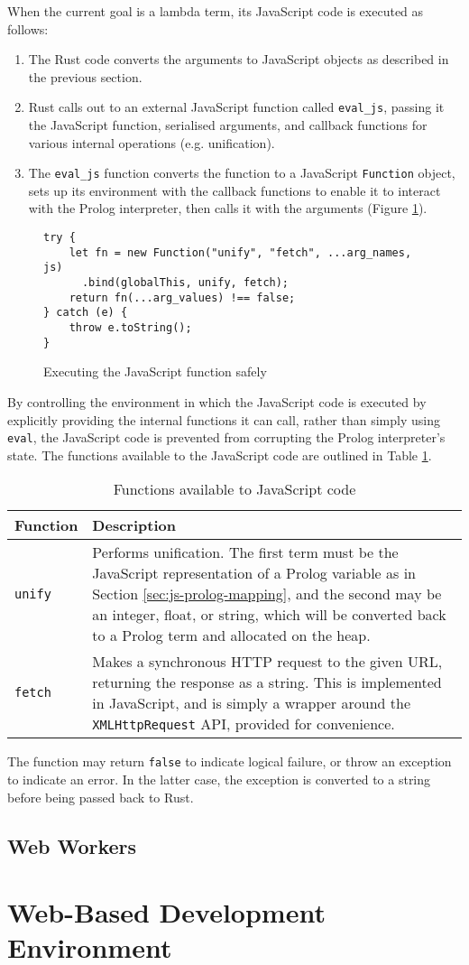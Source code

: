 When the current goal is a lambda term, its JavaScript code is executed as follows:

\begin{enumerate}
\item The Rust code converts the arguments to JavaScript objects as described in the previous section.
\item Rust calls out to an external JavaScript function called \texttt{eval\_js}, passing it the JavaScript function, serialised arguments, and callback functions for various internal operations (e.g. unification).
\item The \texttt{eval\_js} function converts the function to a JavaScript \texttt{Function} object, sets up its environment with the callback functions to enable it to interact with the Prolog interpreter, then calls it with the arguments (Figure \ref{fig:js-execution}).
\end{enumerate}

\begin{figure}[H]
\centering
\begin{verbatim}
try {
    let fn = new Function("unify", "fetch", ...arg_names, js)
      .bind(globalThis, unify, fetch);
    return fn(...arg_values) !== false;
} catch (e) {
    throw e.toString();
}
\end{verbatim}
\caption{Executing the JavaScript function safely}
\label{fig:js-execution}
\end{figure}

By controlling the environment in which the JavaScript code is executed by explicitly providing the internal functions it can call, rather than simply using \texttt{eval}, the JavaScript code is prevented from corrupting the Prolog interpreter's state. The functions available to the JavaScript code are outlined in Table \ref{tab:js-ffi}.

\begin{table}[H]
\centering
\begin{tabular}{lp{12cm}}
\hline
\textbf{Function} & \textbf{Description} \\
\hline
\texttt{unify} & Performs unification. The first term must be the JavaScript representation of a Prolog variable as in Section \ref{sec:js-prolog-mapping}, and the second may be an integer, float, or string, which will be converted back to a Prolog term and allocated on the heap. \\
\texttt{fetch} & Makes a synchronous HTTP request to the given URL, returning the response as a string. This is implemented in JavaScript, and is simply a wrapper around the \texttt{XMLHttpRequest} API, provided for convenience. \\
\hline
\end{tabular}
\caption{Functions available to JavaScript code}
\label{tab:js-ffi}
\end{table}

The function may return \texttt{false} to indicate logical failure, or throw an exception to indicate an error. In the latter case, the exception is converted to a string before being passed back to Rust.

\subsection{Web Workers}

\section{Web-Based Development Environment}